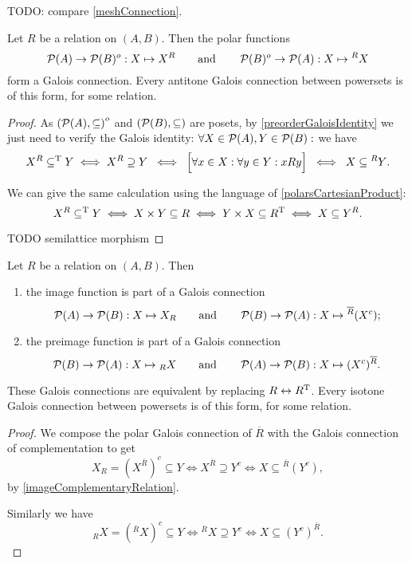 TODO: compare \ref{meshConnection}.

\begin{proposition} \label{polarsGaloisConnection}
Let $R$ be a relation on $(A,B)$. Then the polar functions
\[ \operatorname{\mathcal{P}}(A)\to\operatorname{\mathcal{P}}(B)^o: X\mapsto X^R \qquad\text{and}\qquad \operatorname{\mathcal{P}}(B)^o\to\operatorname{\mathcal{P}}(A): X\mapsto {^RX} \]
form a Galois connection. Every antitone Galois connection between powersets is of this form, for some relation.
\end{proposition}
\begin{proof}
As $\sSet{\powerset(A), \subseteq}^o$ and $\sSet{\powerset(B), \subseteq}$ are posets, by \ref{preorderGaloisIdentity} we just need to verify the Galois identity: $\forall X\in \operatorname{\mathcal{P}}(A), Y\in\operatorname{\mathcal{P}}(B):$ we have
\[ X^R \subseteq^{\mathrm{T}} Y \iff X^R \supseteq Y \;\iff\; \Big[ \forall x\in X: \forall y\in Y: xRy \Big] \;\iff\; X \subseteq {^RY}. \]

We can give the same calculation using the language of \ref{polarsCartesianProduct}:
\[ X^R \subseteq^{\mathrm{T}} Y \iff X\times Y \subseteq R \iff Y\times X \subseteq R^{\mathrm{T}} \iff X \subseteq Y^R. \]

TODO semilattice morphism
\end{proof}
\begin{proposition} \label{imagePreimageGaloisConnection}
Let $R$ be a relation on $(A, B)$. Then
\begin{enumerate}
\item the image function is part of a Galois connection
\[ \operatorname{\mathcal{P}}(A)\to\operatorname{\mathcal{P}}(B): X\mapsto X_R \qquad\text{and}\qquad \operatorname{\mathcal{P}}(B)\to\operatorname{\mathcal{P}}(A): X\mapsto {^{\overline{R}}(X^c)}; \]
\item the preimage function is part of a Galois connection
\[ \operatorname{\mathcal{P}}(B)\to\operatorname{\mathcal{P}}(A): X\mapsto {_RX} \qquad\text{and}\qquad \operatorname{\mathcal{P}}(A)\to\operatorname{\mathcal{P}}(B): X\mapsto (X^c)^{\overline{R}}. \]
\end{enumerate}
These Galois connections are equivalent by replacing $R \leftrightarrow R^{\mathrm{T}}$. Every isotone Galois connection between powersets is of this form, for some relation.
\end{proposition}
\begin{proof}
We compose the polar Galois connection of $\overline{R}$ with the Galois connection of complementation to get
\[ X_R = (X^{\overline{R}})^c \subseteq Y \iff X^{\overline{R}} \supseteq Y^c \iff X \subseteq {^{\overline{R}}(Y^c)}, \]
by \ref{imageComplementaryRelation}.

Similarly we have
\[ {_RX} = ({^{\overline{R}}X})^c \subseteq Y \iff {^{\overline{R}}}X \supseteq Y^c \iff X \subseteq (Y^c)^{\overline{R}}. \]
\end{proof}
